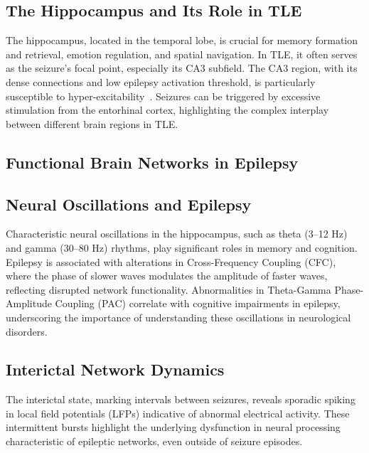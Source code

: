 \subsection{The Hippocampus and Its Role in TLE}
The hippocampus, located in the temporal lobe, is crucial for memory formation 
and retrieval, emotion regulation, and spatial navigation. In TLE, it often 
serves as the seizure's focal point, especially its CA3 subfield. The CA3 region, 
with its dense connections and low epilepsy activation threshold, is particularly 
susceptible to hyper-excitability~\parencite{witterIntrinsicExtrinsicWiring2007}. Seizures can be 
triggered by excessive stimulation from the entorhinal cortex, highlighting the 
complex interplay between different brain regions in TLE\@.

\subsection{Functional Brain Networks in Epilepsy}


\subsection{Neural Oscillations and Epilepsy}
Characteristic neural oscillations in the hippocampus, such as theta (3--12 Hz) 
and gamma (30--80 Hz) rhythms, play significant roles in memory and cognition. 
Epilepsy is associated with alterations in Cross-Frequency Coupling (CFC), where 
the phase of slower waves modulates the amplitude of faster waves, reflecting 
disrupted network functionality. Abnormalities in Theta-Gamma Phase-Amplitude 
Coupling (PAC) correlate with cognitive impairments in epilepsy, underscoring 
the importance of understanding these oscillations in neurological disorders.

\subsection{Interictal Network Dynamics}
The interictal state, marking intervals between seizures, reveals sporadic 
spiking in local field potentials (LFPs) indicative of abnormal electrical 
activity. These intermittent bursts highlight the underlying dysfunction in 
neural processing characteristic of epileptic networks, even outside of 
seizure episodes.


